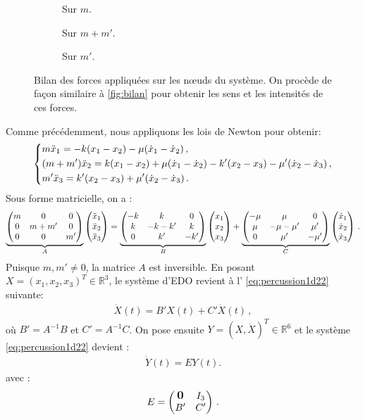 \begin{figure}[!h]
    \begin{subfigure}[b]{0.25\textwidth}
        \centering
        \caption{Sur $m$.}
        \label{fig:bilan12}
    \end{subfigure}
    \begin{subfigure}[b]{0.31\textwidth}
        \centering
        \caption{Sur $m+m'$.}
        \label{fig:bilan22}
    \end{subfigure}
    \begin{subfigure}[b]{0.23\textwidth}
        \centering
        \caption{Sur $m'$.}
        \label{fig:bilan32}
    \end{subfigure}
       \caption{Bilan des forces appliquées sur les n\oe{}uds du système. On procède de façon similaire à \cref{fig:bilan} pour obtenir les sens et les intensités de ces forces.}
       \label{fig:bilan2}
\end{figure}

\noindent Comme précédemment, nous appliquons les lois de Newton pour obtenir:
\begin{align}
    \begin{dcases}
    m\ddot x_1 = -k(x_1 - x_2) - \mu (\dot x_1 - \dot x_2) \,, \\
    (m+m')\ddot x_2 = k(x_1 - x_2) + \mu (\dot x_1 - \dot x_2) - k'(x_2 - x_3) - \mu'(\dot x_2 - \dot x_3) \,, \\
        m' \ddot x_3 =  k'(x_2 - x_3) + \mu'(\dot x_2 - \dot x_3) \,. 
    \end{dcases}
\end{align}
Sous forme matricielle, on a :
\begin{align}
    \underbrace{\begin{pmatrix} m & 0 & 0 \\ 0 & m+m' & 0 \\ 0 & 0 & m' \end{pmatrix}}_{A} \begin{pmatrix} \ddot{x}_1 \\ \ddot{x}_2 \\ \ddot{x}_3 \end{pmatrix} =  
    \underbrace{\begin{pmatrix} -k & k & 0 \\ k & -k-k' & k \\ 0 & k' & -k' \end{pmatrix}}_{B} \begin{pmatrix} x_1 \\ x_2 \\ x_3 \end{pmatrix} + 
    \underbrace{\begin{pmatrix} -\mu & \mu & 0 \\ \mu & -\mu-\mu' & \mu' \\ 0 & \mu' & -\mu' \end{pmatrix}}_{C} \begin{pmatrix} \dot{x}_1 \\ \dot{x}_2 \\ \dot{x}_3 \end{pmatrix} \,.
\end{align}
Puisque $m, m'\neq 0$, la matrice $A$ est inversible. En posant $X = (x_1, x_2, x_3)^T \in \mathbb{R}^3$, le système d'EDO revient à l' \cref{eq:percussion1d22} suivante:
\begin{align} \label{eq:percussion1d22}
        \ddot{X}(t) = B' X(t) + C'\dot{X}(t) \,, 
\end{align}
où $B' = A^{-1}B$ et $C' = A^{-1}C$. On pose ensuite $Y= (X, \dot X)^T \in \mathbb{R}^6$ et le système \cref{eq:percussion1d22} devient :
\begin{align} \label{eq:systeme1d2}
        \dot{Y}(t)= E Y(t).
\end{align}
avec : $$ E = \begin{pmatrix} \mbox{\normalfont\large\bfseries 0} & I_3 \\ B' & C' \end{pmatrix} \,.$$


